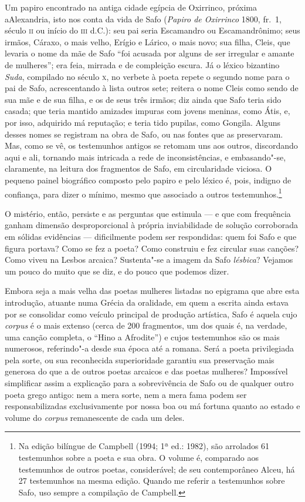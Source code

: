 Um papiro encontrado na antiga cidade egípcia de Oxirrinco, próxima a\EP[]
Alexandria, isto nos conta da vida de Safo (\textit{Papiro de Oxirrinco} 1800,
fr.~1, século \textsc{ii} ou início do \textsc{iii} d.C.): seu pai seria Escamandro ou
Escamandrônimo; seus irmãos, Cáraxo, o mais velho, Erígio e Lárico, o mais
novo; sua filha, Cleis, que levaria o nome da mãe de Safo ``foi acusada
por alguns de ser irregular e amante de mulheres”; era feia, mirrada e de
compleição escura. Já o léxico bizantino \textit{Suda}, compilado no século \textsc{x},
no verbete à poeta repete o segundo nome para o pai de Safo, acrescentando à
lista outros sete; reitera o nome Cleis como sendo de sua mãe e de sua filha, e
os de seus três irmãos; diz ainda que Safo teria sido casada; que teria mantido
amizades impuras com jovens meninas, como Átis, e, por isso, adquirido má
reputação; e teria tido pupilas, como Gongila. Alguns desses nomes se registram
na obra de Safo, ou nas fontes que as preservaram. Mas, como se vê, os
testemunhos antigos se retomam uns aos outros, discordando aqui e ali, tornando
mais intricada a rede de inconsistências, e embasando"-se, claramente, na
leitura dos fragmentos de Safo, em circularidade viciosa. O pequeno painel
biográfico composto pelo papiro e pelo léxico é, pois, indigno de confiança,
para dizer o mínimo, mesmo que associado a outros testemunhos.\footnote{ Na
edição bilíngue de Campbell (1994; 1ª ed.: 1982), são arrolados 61 testemunhos
sobre a poeta e sua obra. O volume é, \mbox{comparado} aos testemunhos de outros
poetas, considerável; de seu contemporâneo Alceu, há 27 testemunhos na mesma edição. 
Quando me referir a testemunhos sobre Safo, uso
sempre a compilação de Campbell.}

O mistério, então, persiste e as perguntas que estimula --- e que com frequência
ganham dimensão desproporcional à própria inviabilidade de solução
corroborada em sólidas evidências --- dificilmente podem ser respondidas: quem
foi Safo e que figura portava? Como se fez a poeta? Como construiu e fez
circular suas canções? Como viveu na Lesbos arcaica? Sustenta"-se a imagem da
Safo \textit{lésbica}? Vejamos um pouco do muito que se diz, e do
pouco que podemos dizer.

Embora seja a mais velha das poetas mulheres listadas no epigrama que abre esta
introdução, atuante numa Grécia da oralidade, em quem a escrita ainda estava
por se consolidar como veículo principal de produção artística, Safo é aquela
cujo \textit{corpus} é o mais extenso (cerca de 200 fragmentos, um dos quais é,
na verdade, uma canção completa, o “Hino a Afrodite”) e cujos testemunhos são
os mais numerosos, referindo"-a desde sua época até a romana. Será a poeta
privilegiada pela sorte, ou sua reconhecida superioridade garantiu sua
preservação mais generosa do que a de outros poetas arcaicos e das poetas
mulheres? Impossível simplificar assim a explicação
para a sobrevivência de Safo ou de qualquer outro poeta grego antigo: nem a
mera sorte, nem a mera fama podem ser responsabilizadas exclusivamente por
nossa boa ou má fortuna quanto ao estado e volume do \textit{corpus}
remanescente de cada um deles.

